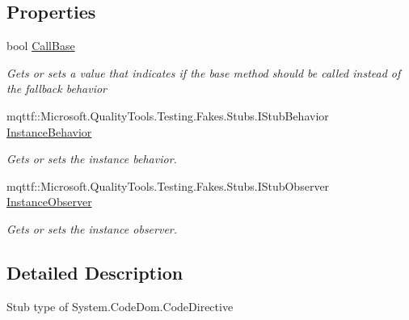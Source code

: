 \subsection*{Properties}
\begin{DoxyCompactItemize}
\item 
bool \hyperlink{class_system_1_1_code_dom_1_1_fakes_1_1_stub_code_directive_a82bd2cbdf8d534c637885566e57ac42c}{Call\-Base}
\begin{DoxyCompactList}\small\item\em Gets or sets a value that indicates if the base method should be called instead of the fallback behavior\end{DoxyCompactList}\item 
mqttf\-::\-Microsoft.\-Quality\-Tools.\-Testing.\-Fakes.\-Stubs.\-I\-Stub\-Behavior \hyperlink{class_system_1_1_code_dom_1_1_fakes_1_1_stub_code_directive_ac5698aa8ce265add4a28806a3ef11c09}{Instance\-Behavior}
\begin{DoxyCompactList}\small\item\em Gets or sets the instance behavior.\end{DoxyCompactList}\item 
mqttf\-::\-Microsoft.\-Quality\-Tools.\-Testing.\-Fakes.\-Stubs.\-I\-Stub\-Observer \hyperlink{class_system_1_1_code_dom_1_1_fakes_1_1_stub_code_directive_add013673564a0a9d47946c6a77fe79ad}{Instance\-Observer}
\begin{DoxyCompactList}\small\item\em Gets or sets the instance observer.\end{DoxyCompactList}\end{DoxyCompactItemize}


\subsection{Detailed Description}
Stub type of System.\-Code\-Dom.\-Code\-Directive




